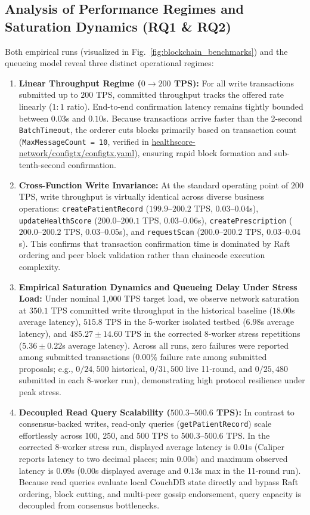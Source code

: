 \documentclass[runningheads]{llncs}
\begin{document}
\subsection{Analysis of Performance Regimes and Saturation Dynamics (RQ1 \& RQ2)}
Both empirical runs (visualized in Fig.~\ref{fig:blockchain_benchmarks}) and the queueing model reveal three distinct operational regimes:

\begin{enumerate}
    \item \textbf{Linear Throughput Regime ($0 \to 200$ TPS):} For all write transactions submitted up to $200$ TPS, committed throughput tracks the offered rate linearly ($1:1$ ratio). End-to-end confirmation latency remains tightly bounded between $0.03$s and $0.10$s. Because transactions arrive faster than the 2-second \texttt{BatchTimeout}, the orderer cuts blocks primarily based on transaction count (\texttt{MaxMessageCount = 10}, verified in \url{healthscore-network/configtx/configtx.yaml}), ensuring rapid block formation and sub-tenth-second confirmation.
    \item \textbf{Cross-Function Write Invariance:} At the standard operating point of $200$ TPS, write throughput is virtually identical across diverse business operations: \texttt{createPatientRecord} ($199.9$--$200.2$ TPS, $0.03$--$0.04$s), \texttt{updateHealthScore} ($200.0$--$200.1$ TPS, $0.03$--$0.06$s), \texttt{createPrescription} ($200.0$--$200.2$ TPS, $0.03$--$0.05$s), and \texttt{requestScan} ($200.0$--$200.2$ TPS, $0.03$--$0.04$s). This confirms that transaction confirmation time is dominated by Raft ordering and peer block validation rather than chaincode execution complexity.
    \item \textbf{Empirical Saturation Dynamics and Queueing Delay Under Stress Load:} Under nominal 1,000 TPS target load, we observe network saturation at $350.1$ TPS committed write throughput in the historical baseline ($18.00$s average latency), $515.8$ TPS in the 5-worker isolated testbed ($6.98$s average latency), and $485.27 \pm 14.60$ TPS in the corrected 8-worker stress repetitions ($5.36 \pm 0.22$s average latency). Across all runs, zero failures were reported among submitted transactions ($0.00\%$ failure rate among submitted proposals; e.g., $0/24,500$ historical, $0/31,500$ live 11-round, and $0/25,480$ submitted in each 8-worker run), demonstrating high protocol resilience under peak stress.
    \item \textbf{Decoupled Read Query Scalability ($500.3$--$500.6$ TPS):} In contrast to consensus-backed writes, read-only queries (\texttt{getPatientRecord}) scale effortlessly across 100, 250, and 500 TPS to $500.3$--$500.6$ TPS. In the corrected 8-worker stress run, displayed average latency is $0.01$s (Caliper reports latency to two decimal places; min $0.00$s) and maximum observed latency is $0.09$s ($0.00$s displayed average and $0.13$s max in the 11-round run). Because read queries evaluate local CouchDB state directly and bypass Raft ordering, block cutting, and multi-peer gossip endorsement, query capacity is decoupled from consensus bottlenecks.
\end{enumerate}
\end{document}
